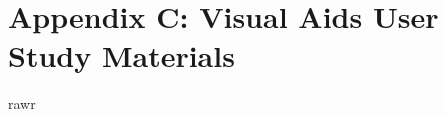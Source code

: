 \section{Appendix C: Visual Aids User Study
Materials}\label{appendix-c-visual-aids-user-study-materials}

rawr
